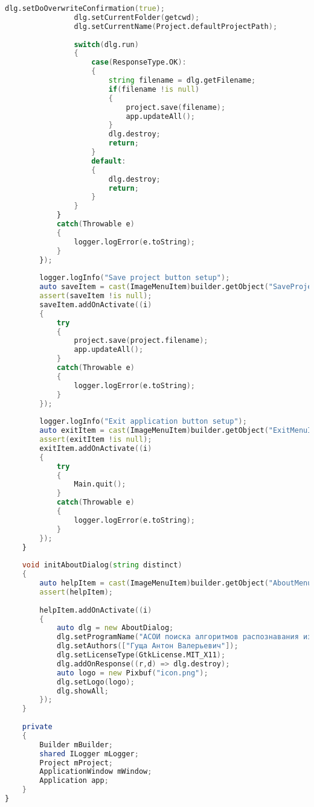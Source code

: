 \documentclass[russian,utf8,emptystyle]{eskdtext}
\begin{document}
\begin{lstlisting}[language=D]
                dlg.setDoOverwriteConfirmation(true);
                dlg.setCurrentFolder(getcwd);
                dlg.setCurrentName(Project.defaultProjectPath);
           
                switch(dlg.run)
                {
                    case(ResponseType.OK):
                    {
                        string filename = dlg.getFilename;
                        if(filename !is null)
                        {
                            project.save(filename);
                            app.updateAll();
                        }
                        dlg.destroy;
                        return;
                    }
                    default:
                    {
                        dlg.destroy;
                        return;
                    }
                } 
            }
            catch(Throwable e)
            {
                logger.logError(e.toString);
            }
        });
        
        logger.logInfo("Save project button setup");
        auto saveItem = cast(ImageMenuItem)builder.getObject("SaveProjectMenuItem"~distinct);
        assert(saveItem !is null);
        saveItem.addOnActivate((i)
        {
            try
            {
                project.save(project.filename);
                app.updateAll();
            }
            catch(Throwable e)
            {
                logger.logError(e.toString);
            }
        });
        
        logger.logInfo("Exit application button setup");
        auto exitItem = cast(ImageMenuItem)builder.getObject("ExitMenuItem"~distinct);
        assert(exitItem !is null);
        exitItem.addOnActivate((i)
        {
            try
            {
                Main.quit();
            }
            catch(Throwable e)
            {
                logger.logError(e.toString);
            }
        });
    }
    
    void initAboutDialog(string distinct)
    {
    	auto helpItem = cast(ImageMenuItem)builder.getObject("AboutMenuItem"~distinct);
    	assert(helpItem);
    	
    	helpItem.addOnActivate((i)
		{
			auto dlg = new AboutDialog;
			dlg.setProgramName("АСОИ поиска алгоритмов распознавания изоморфизма графов\n" "Курсовое проектирование МГТУ им. Н.Э.Баумана\n" "Научный руководитель: Филиппович Юрий Николаевич");
			dlg.setAuthors(["Гуща Антон Валерьевич"]);
			dlg.setLicenseType(GtkLicense.MIT_X11);
			dlg.addOnResponse((r,d) => dlg.destroy);
			auto logo = new Pixbuf("icon.png");
			dlg.setLogo(logo);
			dlg.showAll;
		});
    }
    
    private
    {
        Builder mBuilder;
        shared ILogger mLogger;
        Project mProject;
        ApplicationWindow mWindow;
        Application app;
    }
}
\end{lstlisting}
\end{document}
